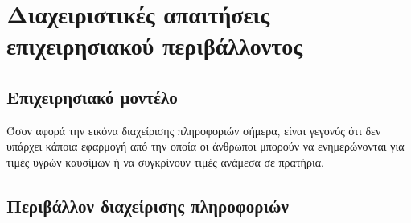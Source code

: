 \section{Διαχειριστικές απαιτήσεις επιχειρησιακού περιβάλλοντος}

\subsection{Επιχειρησιακό μοντέλο}
Όσον αφορά την εικόνα διαχείρισης πληροφοριών σήμερα, είναι γεγονός ότι δεν υπάρχει κάποια εφαρμογή από την οποία οι άνθρωποι μπορούν να ενημερώνονται για τιμές υγρών καυσίμων ή να συγκρίνουν τιμές ανάμεσα σε πρατήρια.

\subsection{Περιβάλλον διαχείρισης πληροφοριών}



